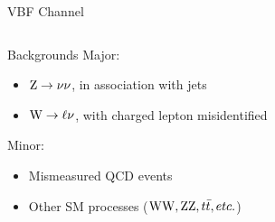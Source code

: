 \documentclass[8pt]{beamer}
\newcommand{\W}{{\rm W}}
\newcommand{\Z}{{\rm Z}}
\begin{document}
\begin{frame}{VBF Channel}
\begin{columns}
\begin{block}{Backgrounds}
Major:
\begin{itemize}
 \item $\Z \rightarrow \nu \nu$, in association with jets
 \item $\W \rightarrow \ell \nu$, with charged lepton misidentified
\end{itemize}

Minor:
\begin{itemize}
 \item Mismeasured QCD events
 \item Other SM processes ($\W\W,\Z\Z,t\bar{t}, etc.$)
\end{itemize}

\end{block}

\end{columns}

\end{frame}
\end{document}
